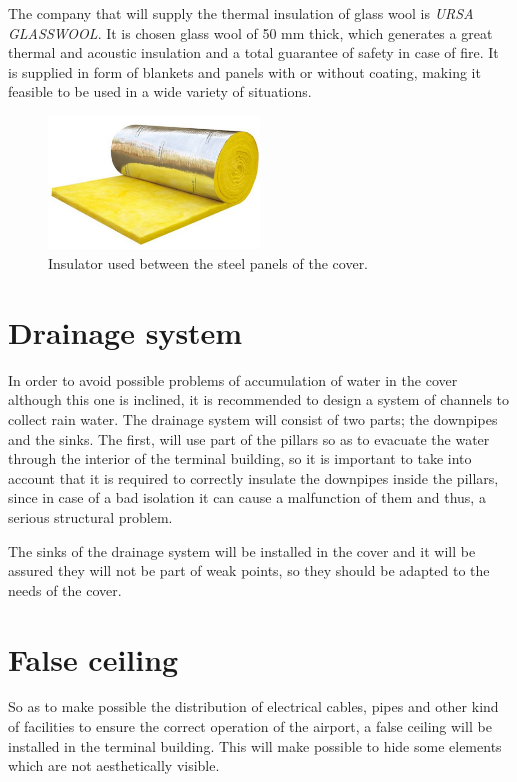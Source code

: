 The company that will supply the thermal insulation of glass wool is \textit{URSA GLASSWOOL}. It is chosen glass wool of 50 mm thick, which generates a great thermal and acoustic insulation and a total guarantee of safety in case of fire. It is supplied in form of blankets and panels with or without coating, making it feasible to be used in a wide variety of situations.

\begin{figure}[H]
	\centering
	\includegraphics[clip, trim=0cm 0cm 0cm 0cm, width=0.5\textwidth]{./images/cover/glasswool}
	\caption{Insulator used between the steel panels of the cover.}
	\label{glasswool}
\end{figure}
		
	\section{Drainage system}
In order to avoid possible problems of accumulation of water in the cover although this one is inclined, it is recommended to design a system of channels to collect rain water. The drainage system will consist of two parts; the downpipes and the sinks. The first, will use part of the pillars so as to evacuate the water through the interior of the terminal building, so it is important to take into account that it is required to correctly insulate the downpipes inside the pillars, since in case of a bad isolation it can cause a malfunction of them and thus, a serious structural problem.

The sinks of the drainage system will be installed in the cover and it will be assured they will not be part of weak points, so they should be adapted to the needs of the cover.

	\section{False ceiling}
So as to make possible the distribution of electrical cables, pipes and other kind of facilities to ensure the correct operation of the airport, a false ceiling will be installed in the terminal building. This will make possible to hide some elements which are not aesthetically visible.

